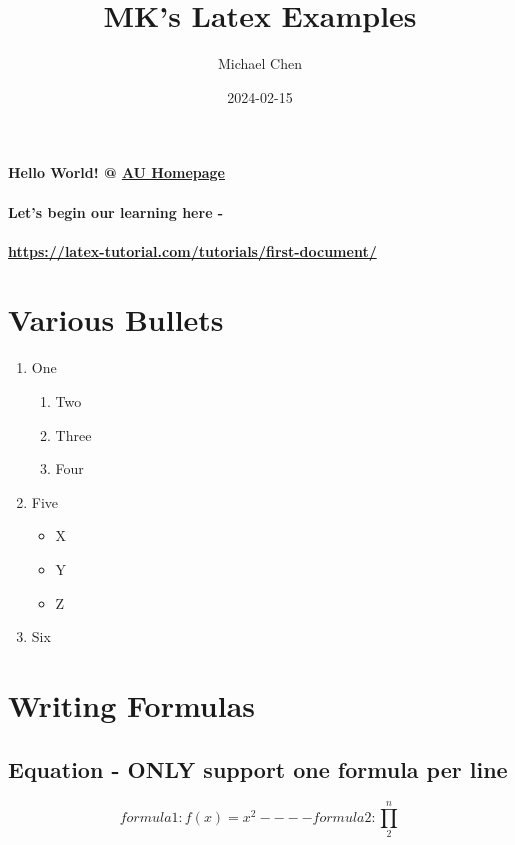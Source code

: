 \documentclass{article}   %
\title{MK's Latex Examples}
\date{2024-02-15}
\author{Michael Chen}
\begin{document}
  \maketitle
  \newpage


  \tableofcontents
  \newpage


  \paragraph{ Hello World! @ \href{https://www.auburn.edu/}{AU Homepage} }
  \paragraph{ Let's begin our learning here -}
  \paragraph{ \url{https://latex-tutorial.com/tutorials/first-document/} }
  \newpage

  \section{Various Bullets}
  \begin{enumerate}
    \item One
    \begin{enumerate}
        \item Two
        \item Three
        \item Four
    \end{enumerate}
    \item Five
      \begin{itemize}
        \item X
        \item Y
        \item Z
      \end{itemize}
    \item Six
  \end{enumerate}
  \newpage


  \section{Writing Formulas}
  \subsection{Equation - ONLY support one formula per line}
  \begin{equation}
    formula 1: f(x) = x^2   ----
    formula 2: \prod_{2}^{n}
  \end{equation}
\end{document}
